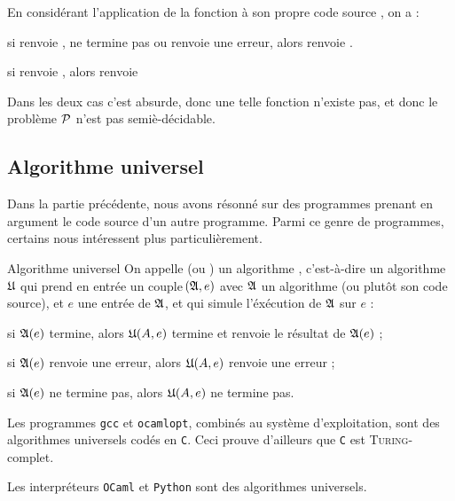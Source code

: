 \documentclass[a4paper,french,bookmarks]{book}
\newcommand{\langOcaml}{\texttt{\color{ocamlColor!20!black}OCaml}}
\newcommand{\langC}{\texttt{\color{ocamlColor!20!black}C}}
\newcommand{\langPython}{\texttt{\color{ocamlColor!20!black}Python}}
\begin{document}
\begin{example}{}{}
        En considérant l'application de la fonction  à son propre code source , on a :
        \begin{enumerate}
            \itb si  renvoie , ne termine pas ou renvoie une erreur, alors  renvoie .
            
            \itb si  renvoie , alors  renvoie 
        \end{enumerate}
        Dans les deux cas c'est absurde, donc une telle fonction  n'existe pas, et donc le problème $\mathcal{P}$ n'est pas semiè-décidable.
    \end{example}
        
    \subsection{Algorithme universel}
    
    Dans la partie précédente, nous avons résonné sur des programmes prenant en argument le code source d'un autre programme. %
    Parmi ce genre de programmes, certains nous intéressent plus particulièrement.
    
    \begin{definition}{Algorithme universel}
        On appelle  (ou ) un algorithme , c'est-à-dire un algorithme $\mathfrak{U}$ qui prend en entrée un couple $\!\left(\mathfrak{A}, e\right)$ avec $\mathfrak{A}$ un algorithme (ou plutôt son code source), et $e$ une entrée de $\mathfrak{A}$, et qui simule l'éxécution de $\mathfrak{A}$ sur $e$ :
        \begin{enumerate}
            \itast si $\mathfrak{A}\!\left(e\right)$ termine, alors $\mathfrak{U}\!\left(A, e\right)$ termine et renvoie le résultat de $\mathfrak{A}\!\left(e\right)$ ;
            
            \itast si $\mathfrak{A}\!\left(e\right)$ renvoie une erreur, alors $\mathfrak{U}\!\left(A, e\right)$ renvoie une erreur ;
            
            \itast si $\mathfrak{A}\!\left(e\right)$ ne termine pas, alors $\mathfrak{U}\!\left(A, e\right)$ ne termine pas.
        \end{enumerate}
    \end{definition}
    
    \begin{example}{}{}
        \begin{enumerate}
            \itt Les programmes \texttt{gcc} et \texttt{ocamlopt}, combinés au système d'exploitation, sont des algorithmes universels codés en \langC{}. Ceci prouve d'ailleurs que \langC{} est \textsc{Turing}-complet.
            
            \itt Les interpréteurs \langOcaml{} et \langPython{} sont des algorithmes universels.
        \end{enumerate}
        
    
        
    \end{example}
    
\end{document}
